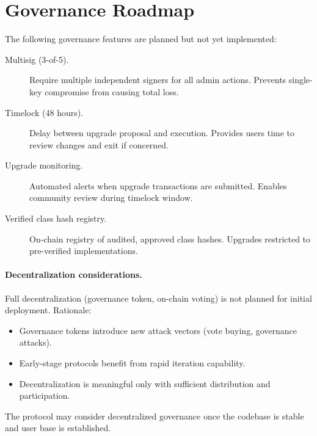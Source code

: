 \section{Governance Roadmap}

The following governance features are planned but not yet implemented:

\begin{description}
\item[Multisig (3-of-5).] Require multiple independent signers for all admin actions. Prevents single-key compromise from causing total loss.

\item[Timelock (48 hours).] Delay between upgrade proposal and execution. Provides users time to review changes and exit if concerned.

\item[Upgrade monitoring.] Automated alerts when upgrade transactions are submitted. Enables community review during timelock window.

\item[Verified class hash registry.] On-chain registry of audited, approved class hashes. Upgrades restricted to pre-verified implementations.
\end{description}

\paragraph{Decentralization considerations.}
Full decentralization (governance token, on-chain voting) is not planned for initial deployment. Rationale:
\begin{itemize}
\item Governance tokens introduce new attack vectors (vote buying, governance attacks).
\item Early-stage protocols benefit from rapid iteration capability.
\item Decentralization is meaningful only with sufficient distribution and participation.
\end{itemize}

\noindent The protocol may consider decentralized governance once the codebase is stable and user base is established.
